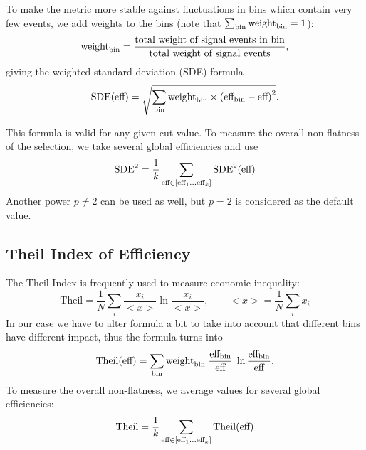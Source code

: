 To make the metric more stable against fluctuations in bins which contain very few events, we add weights to the bins (note that $\sum_{\text{bin}} \text{weight}_\text{bin} = 1$):
\[
	\text{weight}_\text{bin} = \dfrac{\text{total weight of signal events in bin}}
		{\text{total weight of signal events}},
\]
giving the weighted standard deviation (SDE) formula
\[
	\text{SDE}(\text{eff}) = 
	\sqrt{\sum_{\text{bin}} \text{weight}_\text{bin} \times \left(\text{eff}_\text{bin} - \text{eff} \right)^2}. 
\] 


This formula is valid for any given cut value. To measure the overall non-flatness of the selection, we
take several global efficiencies and use
\[
	\text{SDE}^2  =  \frac{1}{k} 
	\sum_{\text{eff} \in [\text{eff}_1 \dots \text{eff}_k] }  
		\text{SDE}^2(\text{eff})
\]
Another power $p \neq 2$ can be used as well, but $p=2$ is considered as the default value.
%
%

\subsection*{Theil Index of Efficiency}
\def\theil{\text{Theil}}

The Theil Index is frequently used to measure economic inequality:
\[
	\theil = \frac{1}{N} \sum_i \frac{x_i}{<x>} \ln{\frac{x_i}{<x>}}, 
		\qquad <x> = \frac{1}{N} \sum_i x_i
\]
In our case we have to alter formula a bit to take into account that different bins have different impact, thus the formula turns into
\[
	\theil(\globaleff) = \sum_\bin \binweight \; \frac{\bineff}{\globaleff} \; \ln{\frac{\bineff}{\globaleff}}.
\]
To measure the overall non-flatness, we
average values for several global efficiencies:
\[
	\theil  =  \frac{1}{k} 
	\sum_{\globaleff \in [\globaleff_1 \dots \globaleff_k] }  
		\theil(\globaleff)
\]

